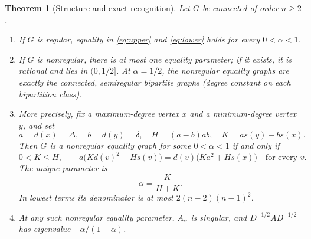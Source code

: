 \documentclass[11pt]{amsart}
\newtheorem{theorem}{Theorem}[section]
\theoremstyle{remark}
\begin{document}
\begin{theorem}[Structure and exact recognition]\label{thm:structure}
Let $G$ be connected of order $n\geq2$.
\begin{enumerate}
\item If $G$ is regular, equality in \eqref{eq:upper} and
\eqref{eq:lower} holds for every $0<\alpha<1$.
\item If $G$ is nonregular, there is at most one equality parameter;
if it exists, it is rational and lies in $(0,1/2]$. At $\alpha=1/2$,
the nonregular equality graphs are exactly the connected, semiregular
bipartite graphs (degree constant on each bipartition class).
\item More precisely, fix a maximum-degree vertex $x$ and a
minimum-degree vertex $y$, and set
\[
 a=d(x)=\Delta,\quad b=d(y)=\delta,\quad
 H=(a-b)ab,\quad K=a s(y)-b s(x).
\]
Then $G$ is a nonregular equality graph for some $0<\alpha<1$
if and only if
\begin{equation}\label{eq:integer-criterion}
 0<K\leq H,\qquad
 a\bigl(Kd(v)^2+Hs(v)\bigr)
  =d(v)\bigl(Ka^2+Hs(x)\bigr)
 \quad\text{for every }v.
\end{equation}
The unique parameter is
\begin{equation}\label{eq:parameter}
 \alpha=\frac{K}{H+K}.
\end{equation}
In lowest terms its denominator is at most
$2(n-2)(n-1)^2$.
\item At any such nonregular equality parameter, $A_\alpha$ is
singular, and $D^{-1/2}AD^{-1/2}$ has eigenvalue
$-\alpha/(1-\alpha)$.
\end{enumerate}
\end{theorem}
\end{document}
